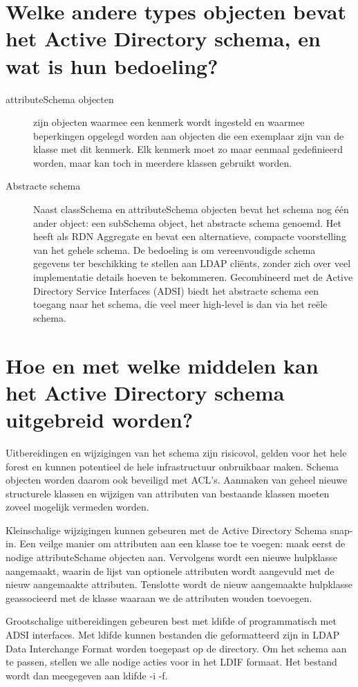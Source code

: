 \section{Welke andere types objecten bevat het Active Directory schema, en wat
is hun bedoeling?}

\begin{description}
	\item[attributeSchema objecten] zijn objecten waarmee een kenmerk wordt
		ingesteld en waarmee beperkingen opgelegd worden aan objecten
		die een exemplaar zijn van de klasse met dit kenmerk. Elk
		kenmerk moet zo maar eenmaal gedefinieerd worden, maar kan toch
		in meerdere klassen gebruikt worden.
	\item[Abstracte schema] Naast classSchema en attributeSchema
		objecten bevat het schema nog één ander object: een subSchema
		object, het abstracte schema genoemd. Het heeft als RDN
		Aggregate en bevat een alternatieve, compacte voorstelling van
		het gehele schema. De bedoeling is om vereenvoudigde schema
		gegevens ter beschikking te stellen aan LDAP cliënts, zonder
		zich over veel implementatie details hoeven te bekommeren.
		Gecombineerd met de Active Directory Service Interfaces (ADSI)
		biedt het abstracte schema een toegang naar het schema, die veel
		meer high-level is dan via het reële schema.
\end{description}

\section{Hoe en met welke middelen kan het Active Directory schema uitgebreid
worden?}

Uitbereidingen en wijzigingen van het schema zijn risicovol, gelden voor het
hele forest en kunnen potentieel de hele infrastructuur onbruikbaar maken.
Schema objecten worden daarom ook beveiligd met ACL's. Aanmaken van geheel
nieuwe structurele klassen en wijzigen van attributen van bestaande klassen
moeten zoveel mogelijk vermeden worden.

Kleinschalige wijzigingen kunnen gebeuren met de Active Directory Schema
snap-in. Een veilge manier om attributen aan een klasse toe te voegen: maak
eerst de nodige attributeSchame objecten aan. Vervolgens wordt een nieuwe
hulpklasse aangemaakt, waarin de lijst van optionele attributen wordt aangevuld
met de nieuw aangemaakte attributen. Tenslotte wordt de nieuw aangemaakte
hulpklasse geassocieerd met de klasse waaraan we de attributen wouden toevoegen.

Grootschalige uitbereidingen gebeuren best met ldifde of programmatisch met ADSI
interfaces. Met ldifde kunnen bestanden die geformatteerd zijn in LDAP Data
Interchange Format worden toegepast op de directory. Om het schema aan te
passen, stellen we alle nodige acties voor in het LDIF formaat. Het bestand
wordt dan meegegeven aan ldifde -i -f.
